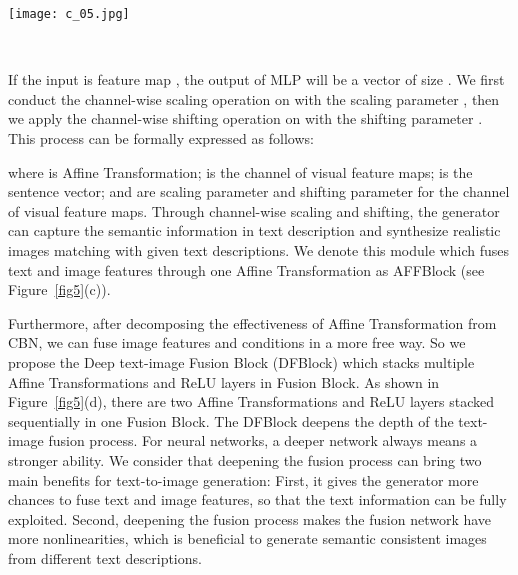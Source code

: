 \documentclass[10pt,twocolumn,letterpaper]{article}
\begin{document}
\begin{figure*}[t] \small
  \centering
  \texttt{[image: c\_05.jpg]}
  \caption{We redesign the architecture of the Fusion Block and compare DFBlock with AFFBlock and CBNBlock. (a) A typical UPBlock in the generator network. The UPBlock upsamples the image features and fuses text and image features by two Fusion Blocks. (b) The CBNBlock is a Fusion Block which employs the Conditional Batch Normalization to fuse text and image features. (c) AFFBlock is a simplified version of CBNBlock which removes the Batch Normalization layer. (d) The DFBlock is an enhanced version of AFFBlock, it deepens the text-image fusion process by stacking multiple Affine Transformations.}
  \label{fig5}\
  \vspace{-0.4cm}
\end{figure*}

If the input is feature map , the output of MLP will be a vector of size . 
We first conduct the channel-wise scaling operation on  with the scaling parameter , then we apply the channel-wise shifting operation on  with the shifting parameter . 
This process can be formally expressed as follows:


where  is Affine Transformation;  is the  channel of visual feature maps;  is the sentence vector;  and  are scaling parameter and shifting parameter for the  channel of visual feature maps. 
Through channel-wise scaling and shifting, the generator can capture the semantic information in text description and synthesize realistic images matching with given text descriptions. 
We denote this module which fuses text and image features through one Affine Transformation as AFFBlock (see Figure~\ref{fig5}(c)).

Furthermore, after decomposing the effectiveness of Affine Transformation from CBN, we can fuse image features and conditions in a more free way. 
So we propose the Deep text-image Fusion Block (DFBlock) which stacks multiple Affine Transformations and ReLU layers in Fusion Block. 
As shown in Figure~\ref{fig5}(d), there are two Affine Transformations and ReLU layers stacked sequentially in one Fusion Block. 
The DFBlock deepens the depth of the text-image fusion process. For neural networks, a deeper network always means a stronger ability. 
We consider that deepening the fusion process can bring two main benefits for text-to-image generation: 
First, it gives the generator more chances to fuse text and image features, so that the text information can be fully exploited. 
Second, deepening the fusion process makes the fusion network have more nonlinearities, which is beneficial to generate semantic consistent images from different text descriptions.
\end{document}

